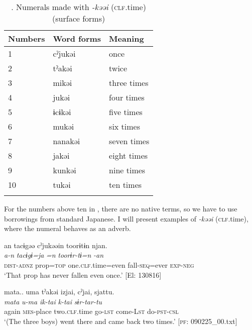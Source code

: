 \begin{table}
\caption{\label{tab:key:48}. Numerals made with \textit{-kəəi} (\textsc{clf}.time) (surface forms)}
\begin{tabular}{lll}
\lsptoprule
Numbers & Word forms  & Meaning\\
\midrule
1 & cˀjukəi&  once        \\
2 & tˀakəi & twice        \\
3 & mikəi  &three times   \\
4 & jukəi  &four times    \\
5 & ɨcɨkəi & five times   \\
6 & mukəi  &six times     \\
7 & nanakəi&  seven times \\
8 & jakəi  &eight times   \\
9 & kunkəi & nine times   \\
10&  tukəi & ten times    \\
\lspbottomrule
\end{tabular}
\end{table}

For the numbers above ten in , there are no native terms, so we have to use borrowings from standard Japanese. I will present examples of \textit{{}-kəəi} (\textsc{clf}.time), where the numeral behaves as an adverb.

\ea \label{ex:7:13}
\ea \label{ex:7:13a}{\TM}
\glll  an  tacɨgəə  cˀjukəəin  toorɨtɨn  njan.\\
\textit{a-n}  \textit{tacɨgɨ=ja}  \textit{=n}  \textit{toorɨr-tɨ=n}  \textit{-an}\\
\textsc{dist}-\textsc{adnz}  prop=\textsc{top}  one.\textsc{clf}.time=even  fall-\textsc{seq}=ever  \textsc{exp}-\textsc{neg}\\
\glt ‘That prop has never fallen even once.’ [El: 130816]

\ex \label{ex:7:13b}{\TM}
\glll  mata..  uma  tˀakəi  izjai,  cˀjai,  sjattu.\\
\textit{mata}  \textit{u-ma}  \textit{}  \textit{ik-tai}  \textit{k-tai}  \textit{sɨr-tar-tu}\\
again  \textsc{mes}-place  two.\textsc{clf}.time  go-\textsc{lst}  come-L\textsc{st}  do-\textsc{pst}-\textsc{csl}\\
\glt ‘(The three boys) went there and came back two times.’ [\textsc{pf}: 090225\_00.txt]

\z
\z

